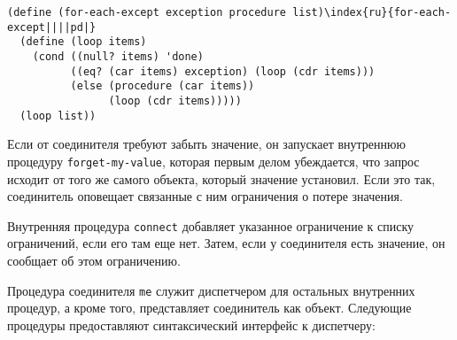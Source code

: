 \begin{Verbatim}[fontsize=\small]
(define (for-each-except exception procedure list)\index{ru}{for-each-except||||pd|}
  (define (loop items)
    (cond ((null? items) 'done)
          ((eq? (car items) exception) (loop (cdr items)))
          (else (procedure (car items))
                (loop (cdr items)))))
  (loop list))
\end{Verbatim}

Если от соединителя требуют забыть значение, он запускает
внутреннюю процедуру {\tt forget-my-value}, которая первым
делом убеждается, что запрос исходит от того же самого объекта,
который значение установил.  Если это так, соединитель оповещает
связанные с ним ограничения о потере значения.

Внутренняя процедура  {\tt connect} добавляет
указанное ограничение к списку ограничений, если его там еще нет.
Затем, если у соединителя есть значение, он сообщает об этом
ограничению.

Процедура соединителя {\tt me} служит диспетчером
для остальных внутренних процедур, а кроме того, представляет
соединитель как объект.  Следующие процедуры предоставляют синтаксический
интерфейс к диспетчеру:

